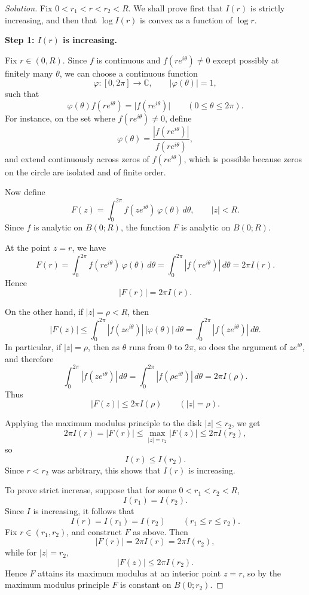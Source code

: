 \documentclass[12pt, a4paper]{report}
\theoremstyle{spaced}
\begin{document}
\begin{proof}[Solution]
	Fix \(0<r_1<r<r_2<R\). We shall prove first that \(I(r)\) is strictly increasing, and then that \(\log I(r)\) is convex as a function of \(\log r\).

	\medskip
	\textbf{Step 1: \(I(r)\) is increasing.}

	Fix \(r\in(0,R)\). Since \(f\) is continuous and \(f(re^{i\theta})\neq 0\) except possibly at finitely many \(\theta\), we can choose a continuous function
	\[
		\varphi:[0,2\pi]\to\mathbb C, \qquad |\varphi(\theta)|=1,
	\]
	such that
	\[
		\varphi(\theta)f(re^{i\theta})=\bigl|f(re^{i\theta})\bigr|
		\qquad (0\le \theta\le 2\pi).
	\]
	For instance, on the set where \(f(re^{i\theta})\neq 0\), define
	\[
		\varphi(\theta)=\frac{|f(re^{i\theta})|}{f(re^{i\theta})},
	\]
	and extend continuously across zeros of \(f(re^{i\theta})\), which is possible because zeros on the circle are isolated and of finite order.

	Now define
	\[
		F(z)=\int_0^{2\pi} f(ze^{i\theta})\,\varphi(\theta)\,d\theta,
		\qquad |z|<R.
	\]
	Since \(f\) is analytic on \(B(0;R)\), the function \(F\) is analytic on \(B(0;R)\).

	At the point \(z=r\), we have
	\[
		F(r)=\int_0^{2\pi} f(re^{i\theta})\,\varphi(\theta)\,d\theta
		=\int_0^{2\pi} |f(re^{i\theta})|\,d\theta
		=2\pi I(r).
	\]
	Hence
	\[
		|F(r)|=2\pi I(r).
	\]

	On the other hand, if \(|z|=\rho<R\), then
	\[
		|F(z)|
		\le \int_0^{2\pi} |f(ze^{i\theta})|\,|\varphi(\theta)|\,d\theta
		= \int_0^{2\pi} |f(ze^{i\theta})|\,d\theta.
	\]
	In particular, if \(|z|=\rho\), then as \(\theta\) runs from \(0\) to \(2\pi\), so does the argument of \(ze^{i\theta}\), and therefore
	\[
		\int_0^{2\pi} |f(ze^{i\theta})|\,d\theta
		=\int_0^{2\pi} |f(\rho e^{i\theta})|\,d\theta
		=2\pi I(\rho).
	\]
	Thus
	\[
		|F(z)|\le 2\pi I(\rho)\qquad (|z|=\rho).
	\]

	Applying the maximum modulus principle to the disk \(|z|\le r_2\), we get
	\[
		2\pi I(r)=|F(r)|\le \max_{|z|=r_2}|F(z)|\le 2\pi I(r_2),
	\]
	so
	\[
		I(r)\le I(r_2).
	\]
	Since \(r<r_2\) was arbitrary, this shows that \(I(r)\) is increasing.

	To prove strict increase, suppose that for some \(0<r_1<r_2<R\),
	\[
		I(r_1)=I(r_2).
	\]
	Since \(I\) is increasing, it follows that
	\[
		I(r)=I(r_1)=I(r_2)\qquad (r_1\le r\le r_2).
	\]
	Fix \(r\in(r_1,r_2)\), and construct \(F\) as above. Then
	\[
		|F(r)|=2\pi I(r)=2\pi I(r_2),
	\]
	while for \(|z|=r_2\),
	\[
		|F(z)|\le 2\pi I(r_2).
	\]
	Hence \(F\) attains its maximum modulus at an interior point \(z=r\), so by the maximum modulus principle \(F\) is constant on \(B(0;r_2)\).


\end{proof}
\end{document}
